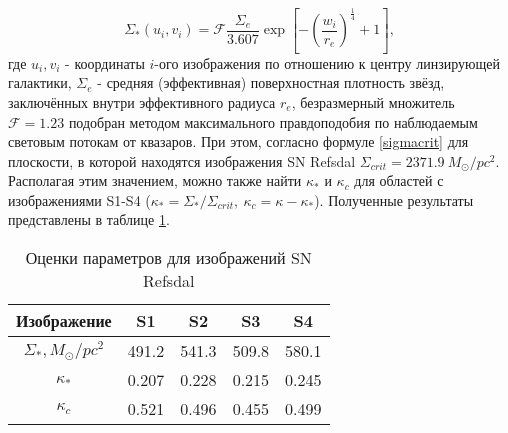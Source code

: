 \begin{equation}\label{vaucouleurs}
\Sigma_*\left(u_{i}, v_{i}\right)=\mathcal{F} \frac{\Sigma_{e}}{3.607} \exp \left[-\left(\frac{w_{i}}{r_{e}}\right)^{\frac{1}{4}}+1\right], 
\end{equation}
где $u_{i}, v_{i}$ - координаты $i$-ого изображения по отношению к центру линзирующей галактики, $\Sigma_e$ - средняя (эффективная) поверхностная плотность звёзд, заключённых внутри эффективного радиуса $r_e$, безразмерный множитель $\mathcal{F}=1.23$ подобран методом максимального правдоподобия по наблюдаемым световым потокам от квазаров. При этом, согласно формуле \eqref{sigmacrit} для плоскости, в которой находятся изображения SN Refsdal  $\Sigma_{crit} = 2371.9 \ M_{\odot}/pc^2 $. Располагая этим значением, можно также найти $\kappa_*$ и $\kappa_c$ для областей с изображениями S1-S4 ($\kappa_*=\Sigma_* /\Sigma_{crit}, \ \kappa_c = \kappa-\kappa_* $). Полученные результаты представлены в таблице \ref{tab:params}.

\begin{table}[H]
  \caption{Оценки параметров для изображений SN Refsdal}
   \label{tab:params}
  \centering
    \begin{tabular}{ | c | c | c | c | c |}
    \hline
    Изображение & S1 & S2 & S3 & S4 \\ \hline
    $\Sigma_*, M_{\odot}/pc^2$ & 491.2 & 541.3 & 509.8 & 580.1\\ \hline
    $\kappa_*$ & 0.207 &  0.228 & 0.215 & 0.245 \\ \hline
    $\kappa_c$ & 0.521 & 0.496 & 0.455 & 0.499 \\ \hline
    \end{tabular}
\end{table}
\\

